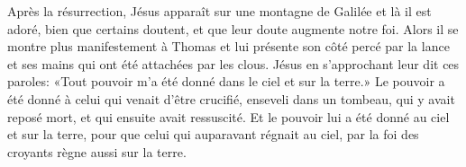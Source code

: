 Après la résurrection, Jésus apparaît sur une montagne de Galilée
	et là il est adoré, bien que certains doutent,
	et que leur doute augmente notre foi.
Alors il se montre plus manifestement à Thomas
	et lui présente son côté percé par la lance
		et ses mains qui ont été attachées par les clous.
Jésus en s’approchant leur dit ces paroles:
	«Tout pouvoir m’a été donné dans le ciel et sur la terre.»
Le pouvoir a été donné à celui qui venait d’être crucifié,
	enseveli dans un tombeau,
	qui y avait reposé mort,
	et qui ensuite avait ressuscité.
Et le pouvoir lui a été donné au ciel et sur la terre,
	pour que celui qui auparavant régnait au ciel,
	par la foi des croyants règne aussi sur la terre.

